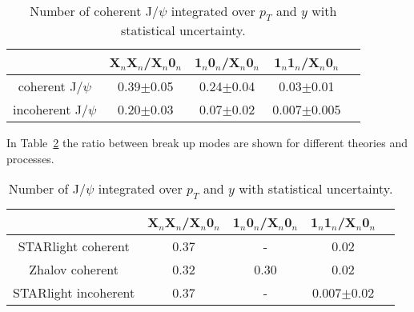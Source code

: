     \begin{table}[h]
      \begin{center}
        \begin{tabular}{|c|c|c|c|c|}
          \hline
          & X$_{n}$X$_{n}$/X$_{n}$0$_{n}$ & 1$_{n}$0$_{n}$/X$_{n}$0$_{n}$ & 1$_{n}$1$_{n}$/X$_{n}$0$_{n}$  \\ \hline
          coherent J/$\psi$ &  0.39$\pm$0.05&0.24$\pm$0.04&0.03$\pm$0.01\\ \hline
          incoherent J/$\psi$ &  0.20$\pm$0.03&0.07$\pm$0.02&0.007$\pm$0.005 \\ \hline
        \end{tabular}
      \caption{\label{tab:r2} Number of coherent J/$\psi$ integrated over $p_{T}$ and $y$ 
        with statistical uncertainty.}
      \end{center}
    \end{table}

    In Table~\ref{tab:r3} the ratio between break up modes are shown for 
      different theories and processes.
    \begin{table}[h]
      \begin{center}
        \begin{tabular}{|c|c|c|c|c|}
          \hline
          & X$_{n}$X$_{n}$/X$_{n}$0$_{n}$ & 1$_{n}$0$_{n}$/X$_{n}$0$_{n}$ & 1$_{n}$1$_{n}$/X$_{n}$0$_{n}$  \\ \hline
          STARlight coherent &  0.37&-&0.02\\ \hline
          Zhalov coherent& 0.32&0.30&0.02\\ \hline
          STARlight incoherent &  0.37&-&0.007$\pm$0.02 \\ \hline
        \end{tabular}
        \caption{\label{tab:r3} Number of  J/$\psi$ integrated over $p_{T}$ and $y$ with 
          statistical uncertainty.}
      \end{center}
    \end{table}
\fi

